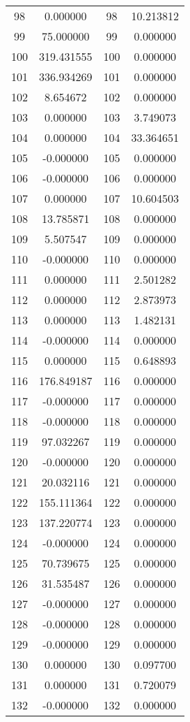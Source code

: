 \documentclass[12pt]{article}
\begin{document}
\begin{longtable}{@{}cccc@{}}
98 & 0.000000 & 98 & 10.213812 \\
99 & 75.000000 & 99 & 0.000000 \\
100 & 319.431555 & 100 & 0.000000 \\
101 & 336.934269 & 101 & 0.000000 \\
102 & 8.654672 & 102 & 0.000000 \\
103 & 0.000000 & 103 & 3.749073 \\
104 & 0.000000 & 104 & 33.364651 \\
105 & -0.000000 & 105 & 0.000000 \\
106 & -0.000000 & 106 & 0.000000 \\
107 & 0.000000 & 107 & 10.604503 \\
108 & 13.785871 & 108 & 0.000000 \\
109 & 5.507547 & 109 & 0.000000 \\
110 & -0.000000 & 110 & 0.000000 \\
111 & 0.000000 & 111 & 2.501282 \\
112 & 0.000000 & 112 & 2.873973 \\
113 & 0.000000 & 113 & 1.482131 \\
114 & -0.000000 & 114 & 0.000000 \\
115 & 0.000000 & 115 & 0.648893 \\
116 & 176.849187 & 116 & 0.000000 \\
117 & -0.000000 & 117 & 0.000000 \\
118 & -0.000000 & 118 & 0.000000 \\
119 & 97.032267 & 119 & 0.000000 \\
120 & -0.000000 & 120 & 0.000000 \\
121 & 20.032116 & 121 & 0.000000 \\
122 & 155.111364 & 122 & 0.000000 \\
123 & 137.220774 & 123 & 0.000000 \\
124 & -0.000000 & 124 & 0.000000 \\
125 & 70.739675 & 125 & 0.000000 \\
126 & 31.535487 & 126 & 0.000000 \\
127 & -0.000000 & 127 & 0.000000 \\
128 & -0.000000 & 128 & 0.000000 \\
129 & -0.000000 & 129 & 0.000000 \\
130 & 0.000000 & 130 & 0.097700 \\
131 & 0.000000 & 131 & 0.720079 \\
132 & -0.000000 & 132 & 0.000000 \\

\end{longtable}
\end{document}
